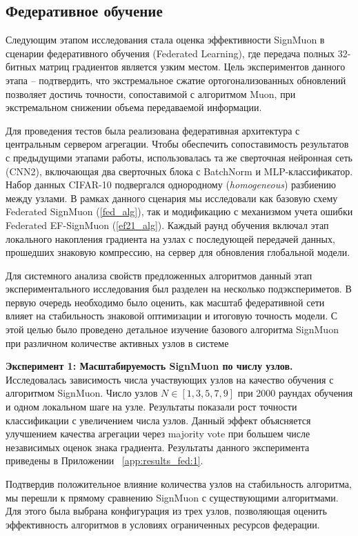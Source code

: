 \documentclass{article}
\begin{document}
\subsection{Федеративное обучение}
Следующим этапом исследования стала оценка эффективности SignMuon в сценарии федеративного обучения (Federated Learning), где передача полных 32-битных матриц градиентов является узким местом. Цель экспериментов данного этапа -- подтвердить, что экстремальное сжатие ортогонализованных обновлений позволяет достичь точности, сопоставимой с алгоритмом Muon, при экстремальном снижении объема передаваемой информации.

Для проведения тестов была реализована федеративная архитектура с центральным сервером агрегации. Чтобы обеспечить сопоставимость результатов с предыдущими этапами работы, использовалась та же сверточная нейронная сеть (CNN2), включающая два сверточных блока с BatchNorm и MLP-классификатор. Набор данных CIFAR-10 подвергался однородному (\textit{homogeneous}) разбиению между узлами. В рамках данного сценария мы исследовали как базовую схему Federated SignMuon (\cref{fed_alg}), так и модификацию с механизмом учета ошибки Federated EF-SignMuon (\cref{ef21_alg}). Каждый раунд обучения включал этап локального накопления градиента на узлах с последующей передачей данных, прошедших знаковую компрессию, на сервер для обновления глобальной модели.

Для системного анализа свойств предложенных алгоритмов данный этап экспериментального исследования был разделен на несколько подэкспериметов. В первую очередь необходимо было оценить, как масштаб федеративной сети влияет на стабильность знаковой оптимизации и итоговую точность модели. С этой целью было проведено детальное изучение базового алгоритма SignMuon при различном количестве активных узлов в системе

\textbf{Эксперимент 1: Масштабируемость SignMuon по числу узлов.} Исследовалась зависимость числа участвующих узлов на качество обучения с алгоритмом SignMuon. Число узлов $N \in [1, 3, 5, 7, 9]$ при 2000 раундах обучения и одном локальном шаге на узле. Результаты показали рост точности классификации с увеличением числа узлов. Данный эффект объясняется улучшением качества агрегации через majority vote при большем числе независимых оценок знака градиента. Результаты данного эксперимента приведены в Приложении ~\ref{app:results_fed:1}. 

Подтвердив положительное влияние количества узлов на стабильность алгоритма, мы перешли к прямому сравнению SignMuon с существующими алгоритмами. Для этого была выбрана конфигурация из трех узлов, позволяющая оценить эффективность алгоритмов в условиях ограниченных ресурсов федерации.
\end{document}
